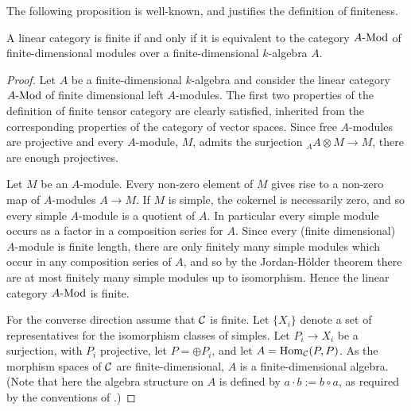 \documentclass{amsart}
\begin{document}
The following proposition is well-known, and justifies the definition of finiteness.

\begin{proposition}
A linear category is finite if and only if it is equivalent to the category $\Mod{A}{}$ of finite-dimensional modules over a finite-dimensional $k$-algebra $A$.
\end{proposition}
\begin{proof}
	Let $A$ be a finite-dimensional $k$-algebra and consider the linear category $\Mod{A}{}$ of finite dimensional left $A$-modules. The first two properties of the definition of finite tensor category are clearly satisfied, inherited from the corresponding properties of the category of vector spaces. Since free $A$-modules are projective and every $A$-module, $M$, admits the surjection ${}_A A \otimes M \to M$, there are enough projectives. 
	
	Let $M$ be an $A$-module. Every non-zero element of $M$ gives rise to a non-zero map of $A$-modules $A \to M$. If $M$ is simple, the cokernel is necessarily zero, and so every simple $A$-module is a quotient of $A$. In particular every simple module occurs as a factor in a composition series for $A$. Since every (finite dimensional) $A$-module is finite length, there are only finitely many simple modules which occur in any composition series of $A$, and so by the Jordan-H\"older theorem there are at most finitely many simple modules up to isomorphism. Hence the linear category $\Mod{A}{}$ is finite.
	
	For the converse direction assume that $\mathcal C$ is finite. Let $\{X_i\}$ denote a set of representatives for the isomorphism classes of simples. Let $P_i \to X_i$ be a surjection, with $P_i$ projective, let $P = \oplus P_i$, and let $A = \operatorname{Hom}_{\mathcal C}(P,P)$. As the morphism spaces of $\mathcal C$ are finite-dimensional, $A$ is a finite-dimensional algebra.  (Note that here the algebra structure on $A$ is defined by $a \cdot b := b \circ a$, as required by the conventions of \cite{DTCI}.)
	

\end{proof}
\end{document}
